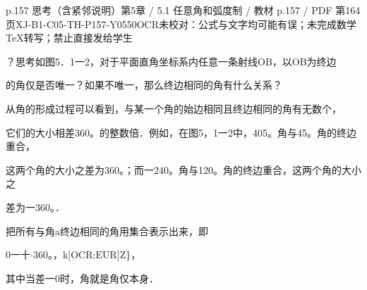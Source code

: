 \begin{bankitem}{p.157 思考（含紧邻说明）}{第5章 / 5.1 任意角和弧度制 / 教材 p.157 / PDF 第164页}{XJ-B1-C05-TH-P157-Y0550}{OCR未校对：公式与文字均可能有误；未完成数学TeX转写；禁止直接发给学生}
\begin{ocrdraft}
\par
？思考如图5．1一2，对于平面直角坐标系内任意一条射线OB，以OB为终边
\par
的角仅是否唯一？如果不唯一，那么终边相同的角有什么关系？
\par
从角的形成过程可以看到，与某一个角的始边相同且终边相同的角有无数个，
\par
它们的大小相差360。的整数倍．例如，在图5，1一2中，405。角与45。角的终边重合，
\par
这两个角的大小之差为360。；而一240。角与120。角的终边重合，这两个角的大小之
\par
差为一360。．
\par
把所有与角a终边相同的角用集合表示出来，即
\par
0一十\ensuremath{\cdot}360。，k\ensuremath{\text{[OCR:EUR]}}Z\}，
\par
其中当差一0时，角就是角仅本身．
\end{ocrdraft}
\end{bankitem}
